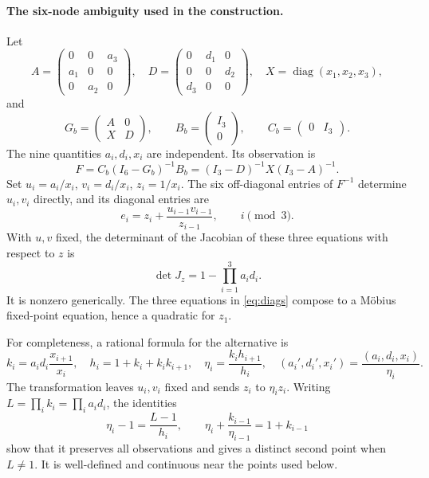 \documentclass[11pt,a4paper]{article}
\newcommand{\diag}{\operatorname{diag}}
\begin{document}
\paragraph{The six-node ambiguity used in the construction.}
Let
\[
 A=\begin{pmatrix}0&0&a_3\\a_1&0&0\\0&a_2&0\end{pmatrix},\quad
 D=\begin{pmatrix}0&d_1&0\\0&0&d_2\\d_3&0&0\end{pmatrix},\quad
 X=\diag(x_1,x_2,x_3),
\]
and
\[
 G_b=\begin{pmatrix}A&0\\X&D\end{pmatrix},\qquad
 B_b=\begin{pmatrix}I_3\\0\end{pmatrix},\qquad
 C_b=\begin{pmatrix}0&I_3\end{pmatrix}.
\]
The nine quantities $a_i,d_i,x_i$ are independent. Its observation is
\[
 F=C_b(I_6-G_b)^{-1}B_b=(I_3-D)^{-1}X(I_3-A)^{-1}.
\]
Set $u_i=a_i/x_i$, $v_i=d_i/x_i$, $z_i=1/x_i$.
The six off-diagonal entries of $F^{-1}$ determine $u_i,v_i$ directly,
and its diagonal entries are
\begin{equation}\label{eq:diags}
 e_i=z_i+\frac{u_{i-1}v_{i-1}}{z_{i-1}},\qquad i\pmod 3.
\end{equation}
With $u,v$ fixed, the determinant of the Jacobian of these three equations
with respect to $z$ is
\begin{equation}\label{eq:local}
 \det J_z=1-\prod_{i=1}^3 a_id_i.
\end{equation}
It is nonzero generically. The three equations in \eqref{eq:diags} compose
to a M\"obius fixed-point equation, hence a quadratic for $z_1$.

For completeness, a rational formula for the alternative is
\begin{equation}\label{eq:branch}
 k_i=a_id_i\frac{x_{i+1}}{x_i},\quad
 h_i=1+k_i+k_ik_{i+1},\quad
 \eta_i=\frac{k_ih_{i+1}}{h_i},\quad
 (a_i',d_i',x_i')=\frac{(a_i,d_i,x_i)}{\eta_i}.
\end{equation}
The transformation leaves $u_i,v_i$ fixed and sends $z_i$ to $\eta_i z_i$.
Writing $L=\prod_i k_i=\prod_i a_id_i$, the identities
\[
 \eta_i-1=\frac{L-1}{h_i},\qquad
 \eta_i+\frac{k_{i-1}}{\eta_{i-1}}=1+k_{i-1}
\]
show that it preserves all observations and gives a distinct second point
when $L\ne1$. It is well-defined and continuous near the points used below.
\end{document}
